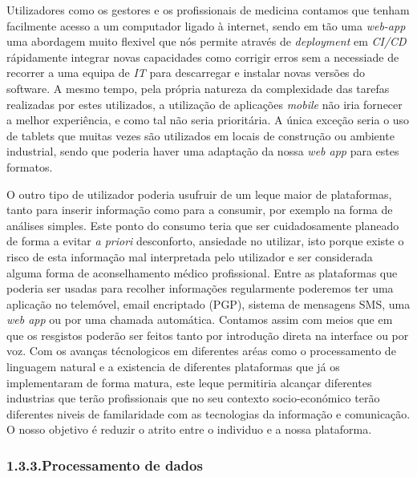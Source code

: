 \documentclass{article}
\begin{document}
\noindent{}Utilizadores como os gestores e os profissionais de medicina contamos que tenham facilmente acesso a um computador ligado à internet, sendo em tão uma \emph{web-app} uma abordagem muito flexivel que nós permite através de \emph{deployment} em \emph{CI/CD} rápidamente integrar novas capacidades como corrigir erros sem a necessiade de recorrer a uma equipa de \emph{IT} para descarregar e instalar novas versões do software. A mesmo tempo, pela própria natureza da complexidade das tarefas realizadas por estes utilizados, a utilização de aplicações \emph{mobile} não iria fornecer a melhor experiência, e como tal não seria prioritária. A única exceção seria o uso de tablets que muitas vezes são utilizados em locais de construção ou ambiente industrial, sendo que poderia haver uma adaptação da nossa \emph{web app} para estes formatos.%

O outro tipo de utilizador poderia usufruir de um leque maior de plataformas, tanto para inserir informação como para a consumir, por exemplo na forma de análises simples. Este ponto do consumo teria que ser cuidadosamente planeado de forma a evitar \emph{a priori} desconforto, ansiedade no utilizar, isto porque existe o risco de esta informação mal interpretada pelo utilizador e ser considerada alguma forma de aconselhamento médico profissional. Entre as plataformas que poderia ser usadas para recolher informações regularmente poderemos ter uma aplicação no telemóvel, email encriptado (PGP), sistema de mensagens SMS, uma \emph{web app} ou por uma chamada automática. Contamos assim com meios que em que os resgistos poderão ser feitos tanto por introdução direta na interface ou por voz. Com os avanças técnologicos em diferentes aréas como o processamento de linguagem natural e a existencia de diferentes plataformas que já os implementaram de forma matura, este leque permitiria alcançar diferentes industrias que terão profissionais que no seu contexto socio-económico terão diferentes niveis de familaridade com as tecnologias da informação e comunicação. O nosso objetivo é reduzir o atrito entre o individuo e a nossa plataforma.%

\subsubsection{1.3.3.\hspace*{0.5em}Processamento de dados}\label{sec-processamento-de-dados}%
\end{document}
